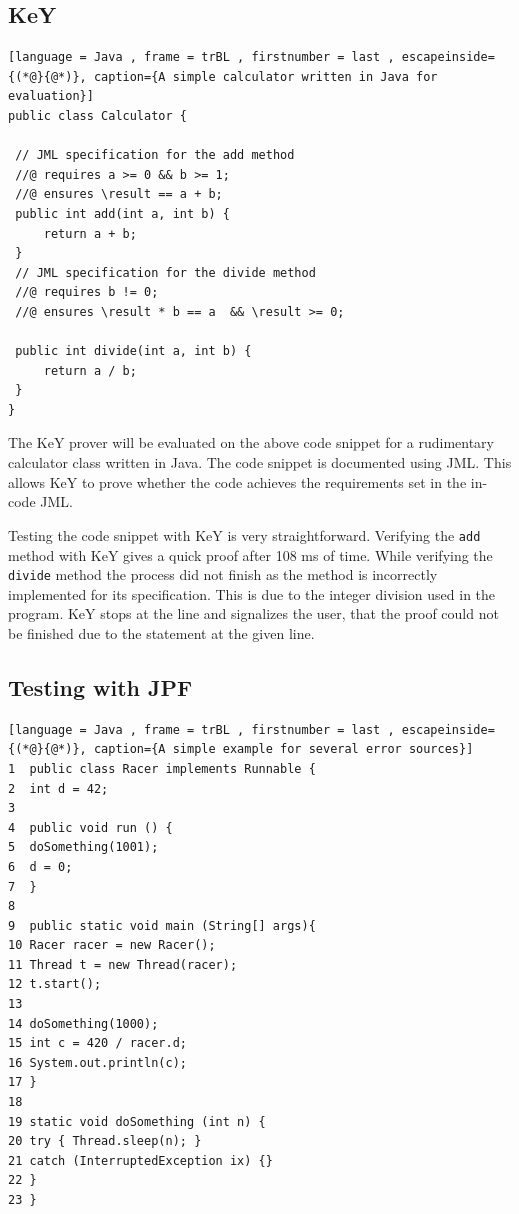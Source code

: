 \subsection{KeY}
\begin{lstlisting}[language = Java , frame = trBL , firstnumber = last , escapeinside={(*@}{@*)}, caption={A simple calculator written in Java for evaluation}]
public class Calculator {

 // JML specification for the add method
 //@ requires a >= 0 && b >= 1;
 //@ ensures \result == a + b;
 public int add(int a, int b) {
     return a + b;
 }
 // JML specification for the divide method
 //@ requires b != 0;
 //@ ensures \result * b == a  && \result >= 0;

 public int divide(int a, int b) {
     return a / b;
 }
}

\end{lstlisting}

The KeY prover will be evaluated on the above code snippet for a rudimentary calculator class written in Java. The code snippet is documented using JML. This allows KeY to prove whether the code achieves the requirements set in the in-code JML.


Testing the code snippet with KeY is very straightforward. Verifying the \verb|add| method with KeY gives a quick proof after 108 ms of time. While verifying the \verb|divide| method the process did not finish as the method is incorrectly implemented for its specification. This is due to the integer division used in the program. KeY stops at the line and signalizes the user, that the proof could not be finished due to the statement at the given line. 

\subsection{Testing with JPF}
\begin{lstlisting}[language = Java , frame = trBL , firstnumber = last , escapeinside={(*@}{@*)}, caption={A simple example for several error sources}]
1  public class Racer implements Runnable {
2  int d = 42;
3  
4  public void run () {
5  doSomething(1001);
6  d = 0;
7  }
8
9  public static void main (String[] args){
10 Racer racer = new Racer();
11 Thread t = new Thread(racer);
12 t.start();
13
14 doSomething(1000);
15 int c = 420 / racer.d;
16 System.out.println(c);
17 }
18
19 static void doSomething (int n) {
20 try { Thread.sleep(n); } 
21 catch (InterruptedException ix) {}
22 }
23 }

\end{lstlisting}

